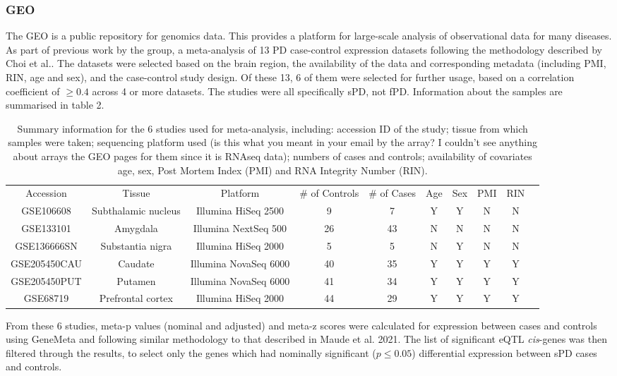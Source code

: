 \documentclass{article}
\begin{document}
\begin{landscape}
\subsubsection{GEO}

The GEO \cite{Barrett2012NCBISetsupdate} is a public repository for genomics data. This provides a platform for large-scale analysis of observational data for many diseases. As part of previous work by the group, a meta-analysis of 13 PD case-control expression datasets following the methodology described by Choi et al.\cite{Choi2003CombiningVariation}. The datasets were selected based on the brain region, the availability of the data and corresponding metadata (including PMI, RIN, age and sex), and the case-control study design. 
Of these 13, 6 of them were selected for further usage, based on a correlation coefficient of $\geq0.4$ across 4 or more datasets.
The studies were all specifically sPD, not fPD. Information about the samples are summarised in table 2.
\begin{table}[h]
    \hskip0cm
    \begin{tabular}{ |c|c|c|c|c|c|c|c|c|c| }
        \hline
        Accession & Tissue & Platform & \# of Controls & \# of Cases & Age & Sex & PMI & RIN \\
        GSE106608 & Subthalamic nucleus & Illumina HiSeq 2500 & 9 & 7 & Y & Y & N & N \\
        GSE133101 & Amygdala & 	Illumina NextSeq 500 & 26 & 43 & N & N & N & N \\
        GSE136666SN & Substantia nigra & Illumina HiSeq 2000 & 5 & 5 & N & Y & N & N \\
        GSE205450CAU & Caudate & Illumina NovaSeq 6000 & 40 & 35 & Y & Y & Y & Y \\
        GSE205450PUT & Putamen & Illumina NovaSeq 6000 & 41 & 34 & Y & Y & Y & Y \\
        GSE68719 & Prefrontal cortex & Illumina HiSeq 2000 & 44 & 29 & Y & Y & Y & Y \\
         \hline
    \end{tabular}
    \caption{Summary information for the 6 studies used for meta-analysis, including: accession ID of the study; tissue from which samples were taken; sequencing platform used (is this what you meant in your email by the array? I couldn't see anything about arrays the GEO pages for them since it is RNAseq data); numbers of cases and controls; availability of covariates age, sex, Post Mortem Index (PMI) and RNA Integrity Number (RIN).}
    \label{tab:my_label}
\end{table}
\end{landscape}
From these 6 studies, meta-p values (nominal and adjusted) and meta-z scores were calculated for expression between cases and controls using GeneMeta\cite{LusaL2024GeneMeta:Experiments.} and following similar methodology to that described in Maude et al. 2021\cite{Maude2021NewDiabetes.}. The list of significant eQTL \textit{cis}-genes was then filtered through the results, to select only the genes which had nominally significant ($p\leq0.05$) differential expression between sPD cases and controls.
\end{document}
